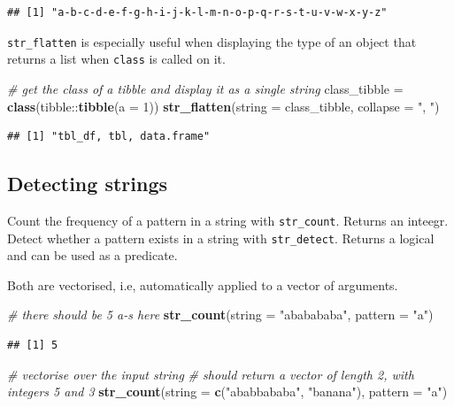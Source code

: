 \documentclass[]{book}
\newenvironment{Shaded}{}{}
\newcommand{\CommentTok}[1]{\textcolor[rgb]{0.38,0.63,0.69}{\textit{#1}}}
\newcommand{\DataTypeTok}[1]{\textcolor[rgb]{0.56,0.13,0.00}{#1}}
\newcommand{\DecValTok}[1]{\textcolor[rgb]{0.25,0.63,0.44}{#1}}
\newcommand{\KeywordTok}[1]{\textcolor[rgb]{0.00,0.44,0.13}{\textbf{#1}}}
\newcommand{\NormalTok}[1]{#1}
\newcommand{\OperatorTok}[1]{\textcolor[rgb]{0.40,0.40,0.40}{#1}}
\newcommand{\StringTok}[1]{\textcolor[rgb]{0.25,0.44,0.63}{#1}}
\begin{document}
\begin{verbatim}
## [1] "a-b-c-d-e-f-g-h-i-j-k-l-m-n-o-p-q-r-s-t-u-v-w-x-y-z"
\end{verbatim}

\texttt{str\_flatten} is especially useful when displaying the type of an object that returns a list when \texttt{class} is called on it.

\begin{Shaded}
\begin{Highlighting}[]
\CommentTok{# get the class of a tibble and display it as a single string}
\NormalTok{class_tibble =}\StringTok{ }\KeywordTok{class}\NormalTok{(tibble}\OperatorTok{::}\KeywordTok{tibble}\NormalTok{(}\DataTypeTok{a =} \DecValTok{1}\NormalTok{))}
\KeywordTok{str_flatten}\NormalTok{(}\DataTypeTok{string =}\NormalTok{ class_tibble, }\DataTypeTok{collapse =} \StringTok{", "}\NormalTok{)}
\end{Highlighting}
\end{Shaded}

\begin{verbatim}
## [1] "tbl_df, tbl, data.frame"
\end{verbatim}

\hypertarget{detecting-strings}{%
\subsection{Detecting strings}\label{detecting-strings}}

Count the frequency of a pattern in a string with \texttt{str\_count}. Returns an inteegr.
Detect whether a pattern exists in a string with \texttt{str\_detect}. Returns a logical and can be used as a predicate.

Both are vectorised, i.e, automatically applied to a vector of arguments.

\begin{Shaded}
\begin{Highlighting}[]
\CommentTok{# there should be 5 a-s here}
\KeywordTok{str_count}\NormalTok{(}\DataTypeTok{string =} \StringTok{"ababababa"}\NormalTok{, }\DataTypeTok{pattern =} \StringTok{"a"}\NormalTok{)}
\end{Highlighting}
\end{Shaded}

\begin{verbatim}
## [1] 5
\end{verbatim}

\begin{Shaded}
\begin{Highlighting}[]
\CommentTok{# vectorise over the input string}
\CommentTok{# should return a vector of length 2, with integers 5 and 3}
\KeywordTok{str_count}\NormalTok{(}\DataTypeTok{string =} \KeywordTok{c}\NormalTok{(}\StringTok{"ababbababa"}\NormalTok{, }\StringTok{"banana"}\NormalTok{), }\DataTypeTok{pattern =} \StringTok{"a"}\NormalTok{)}
\end{Highlighting}
\end{Shaded}
\end{document}
